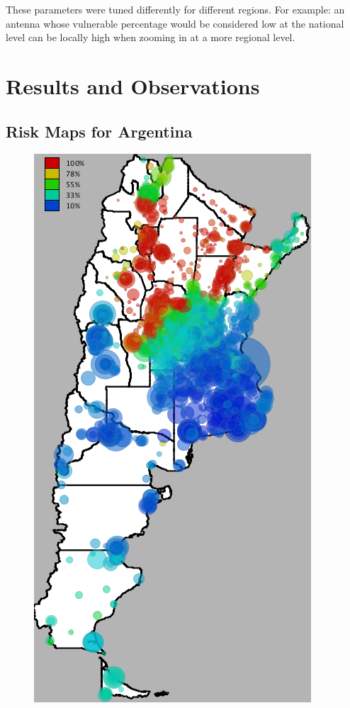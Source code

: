 These parameters were tuned differently for different regions. For example: an antenna whose vulnerable percentage would be considered low at the national level can be locally high when zooming in at a more regional level.



\section{Results and Observations} \label{results}

\subsection{Risk Maps for Argentina}


\begin{figure}[h!]
	
	\begin{minipage}{.495\linewidth}
		\centering
		\includegraphics[width=0.90\linewidth]
		{figures/201112_hi_res_argentina_usuarios_proporcion_circulos_beta1/201112_hi_res_argentina_usuarios_proporcion_circulos_beta1}
		

\end{minipage}
\end{figure}
